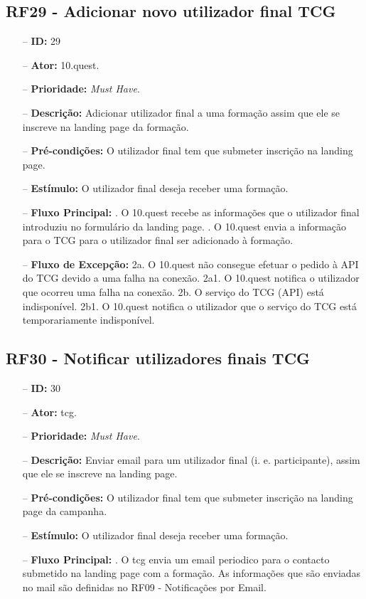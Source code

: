 \subsection{RF29 - Adicionar novo utilizador final TCG}
\begin{itemize}
	\item[--] \textbf{ID:} 29
	\item[--]  \textbf{Ator:} 10.quest.
	\item[--]  \textbf{Prioridade:} \textit{Must Have}.
	\item[--]  \textbf{Descrição:} Adicionar utilizador final a uma formação assim que ele se inscreve na landing page da formação.
	\item[--]  \textbf{Pré-condições:} O utilizador final tem que submeter inscrição na landing page.
	\item[--]  \textbf{Estímulo:} O utilizador final deseja receber uma formação.
	\item[--]  \textbf{Fluxo Principal:} 
	. O 10.quest recebe as informações que o utilizador final introduziu no formulário da landing page.
	. O 10.quest envia a informação para o TCG para o utilizador final ser adicionado à formação.
	\item[--]  \textbf{Fluxo de Excepção:} 
	\subitem 2a. O 10.quest não consegue efetuar o pedido à API do TCG devido a uma falha na conexão.
	\subitem 2a1. O 10.quest notifica o utilizador que ocorreu uma falha na conexão.
	\subitem 2b. O serviço do TCG (API) está indisponível.
	\subitem 2b1. O 10.quest notifica o utilizador que o serviço do TCG está temporariamente indisponível. 
\end{itemize}
\newpage

\subsection{RF30 - Notificar utilizadores finais TCG}
\begin{itemize}
	\item[--] \textbf{ID:} 30
	\item[--]  \textbf{Ator:} \acrfull{tcg}.
	\item[--]  \textbf{Prioridade:} \textit{Must Have}.
	\item[--]  \textbf{Descrição:} Enviar email para um utilizador final (i. e. participante), assim que ele se inscreve na landing page.
	\item[--]  \textbf{Pré-condições:} O utilizador final tem que submeter inscrição na landing page da campanha.
	\item[--]  \textbf{Estímulo:} O utilizador final deseja receber uma formação.
	\item[--]  \textbf{Fluxo Principal:} 
	. O \acrshort{tcg} envia um email periodico para o contacto submetido na landing page com a formação. As informações que são enviadas no mail são definidas no RF09 - Notificações por Email.
\end{itemize}
\newpage

